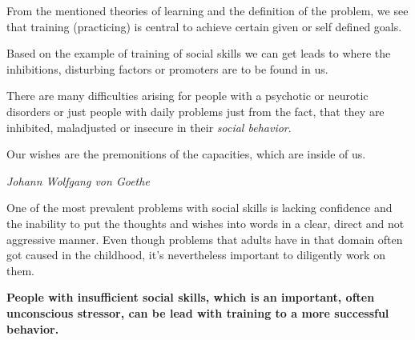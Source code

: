 \documentclass[../main.tex]{subfiles}
\begin{document}
        From the mentioned theories of learning and the definition of the problem, we see that training (practicing) is central to achieve certain given or self defined goals.


        Based on the example of training of social skills we can get leads to where the inhibitions, disturbing factors or promoters are to be found in us.

        There are many difficulties arising for people with a psychotic or neurotic disorders or just people with daily problems just from the fact, that they are inhibited, maladjusted or insecure in their \emph{social behavior}.


\epigraph{Our wishes are the premonitions of the capacities, which are inside of us.}{\textit{Johann Wolfgang von Goethe}}

One of the most prevalent problems with social skills is lacking confidence and the inability to put the thoughts and wishes into words in a clear, direct and not aggressive manner. Even though problems that adults have in that domain often got caused in the childhood, it's nevertheless important to diligently work on them.

\textbf{People with insufficient social skills, which is an important, often unconscious stressor, can be lead with training to a more successful behavior.}

\vspace{1cm}

\end{document}

